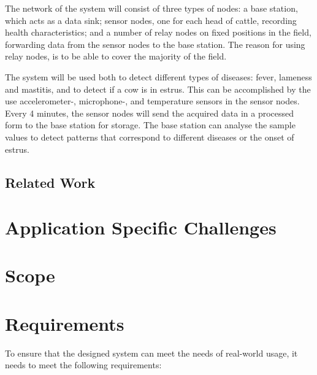 \documentclass[conference]{IEEEtran}
\begin{document}
The network of the system will consist of three types of nodes: a base station,
which acts as a data sink; sensor nodes, one for each head of cattle, recording
health characteristics; and a number of relay nodes on fixed positions in the
field, forwarding data from the sensor nodes to the base station. The reason
for using relay nodes, is to be able to cover the majority of the field.

The system will be used both to detect different types of diseases: fever,
lameness and mastitis, and to detect if a cow is in estrus.  This can be
accomplished by the use accelerometer-, microphone-, and temperature sensors in
the sensor nodes.~\cite{hese2014}  Every 4 minutes, the sensor nodes will send the acquired
data in a processed form to the base station for storage. The base station can
analyse the sample values to detect patterns that correspond to different
diseases or the onset of estrus.

\subsection{Related Work}


\section{Application Specific Challenges}


\section{Scope}


\section{Requirements}

To ensure that the designed system can meet the needs of real-world usage, it
needs to meet the following requirements:
\end{document}
